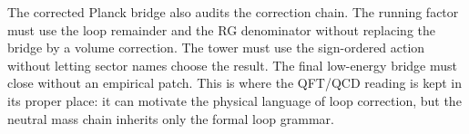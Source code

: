 \documentclass[11pt]{article}
\begin{document}
The corrected Planck bridge also audits the correction chain.  The running
factor must use the loop remainder and the RG denominator without replacing
the bridge by a volume correction.  The tower must use the sign-ordered action
without letting sector names choose the result.  The final low-energy bridge
must close without an empirical patch.  This is where the QFT/QCD reading is
kept in its proper place: it can motivate the physical language of loop
correction, but the neutral mass chain inherits only the formal loop grammar.

\begin{code}%
\>[0]\<%
\\
\>[0]\AgdaSpace{}%
\AgdaSymbol{:}\<%
\\
\>[0][@{}l@{\AgdaIndent{0}}]%
\>[2]\AgdaSpace{}%
\AgdaSpace{}%
\AgdaSpace{}%
\<%
\\
\>[0]\AgdaSpace{}%
\AgdaSymbol{(\AgdaUnderscore{}}\AgdaSpace{}%
\AgdaOperator{\AgdaInductiveConstructor{,}}\AgdaSpace{}%
\AgdaSymbol{(\AgdaUnderscore{}}\AgdaSpace{}%
\AgdaOperator{\AgdaInductiveConstructor{,}}\AgdaSpace{}%
\AgdaSymbol{(\AgdaUnderscore{}}\AgdaSpace{}%
\AgdaOperator{\AgdaInductiveConstructor{,}}\AgdaSpace{}%
\AgdaSymbol{())))}\<%
\\
%
\\[\AgdaEmptyExtraSkip]%
\>[0]\AgdaSpace{}%
\AgdaSymbol{:}\<%
\\
\>[0][@{}l@{\AgdaIndent{0}}]%
\>[2]\AgdaSpace{}%
\AgdaSpace{}%
\AgdaSpace{}%
\<%
\\
\>[0]\AgdaSpace{}%
\AgdaSymbol{(\AgdaUnderscore{}}\AgdaSpace{}%
\AgdaOperator{\AgdaInductiveConstructor{,}}\AgdaSpace{}%
\AgdaSymbol{(\AgdaUnderscore{}}\AgdaSpace{}%
\AgdaOperator{\AgdaInductiveConstructor{,}}\AgdaSpace{}%
\AgdaSymbol{(\AgdaUnderscore{}}\AgdaSpace{}%
\AgdaOperator{\AgdaInductiveConstructor{,}}\AgdaSpace{}%
\AgdaSymbol{())))}\<%
\\
%
\\[\AgdaEmptyExtraSkip]%
\>[0]\AgdaSpace{}%
\AgdaSymbol{:}\<%
\\

\end{code}
\end{document}
